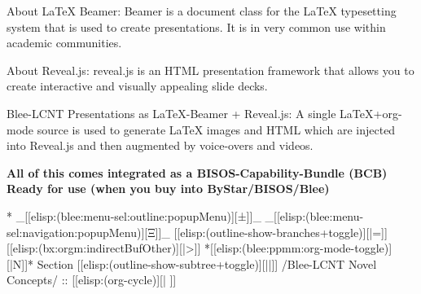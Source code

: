 \begin{whenOrg}
\begin{verblatex}
\begin{frame}[fragile,plain,label=beamerPlusReveal]
    \begin{block}{About LaTeX Beamer:}
      Beamer is a document class for the LaTeX typesetting system that is used to create presentations.
      It is in very common use within academic communities.
    \end{block}

    \begin{block}{About Reveal.js:}
          reveal.js is an HTML presentation framework that allows you to create interactive and visually appealing slide decks.
    \end{block}

    \begin{exampleblock}{Blee-LCNT Presentations as LaTeX-Beamer + Reveal.js:}
          A single LaTeX+org-mode source is used to generate LaTeX images and HTML which are injected into Reveal.js and
          then augmented by voice-overs and videos.
    \end{exampleblock}

    \begin{center}
      \colorbox{blue!30}{\color{black}
       \textbf{All of this comes integrated as a BISOS-Capability-Bundle (BCB)}}
      \colorbox{blue!30}{\color{black}
       \textbf{Ready for use (when you buy into ByStar/BISOS/Blee)}}
    \end{center}


\end{frame}
\end{verblatex}


\begin{whenOrg}
*  _[[elisp:(blee:menu-sel:outline:popupMenu)][±]]_ _[[elisp:(blee:menu-sel:navigation:popupMenu)][Ξ]]_ [[elisp:(outline-show-branches+toggle)][|=]] [[elisp:(bx:orgm:indirectBufOther)][|>]] *[[elisp:(blee:ppmm:org-mode-toggle)][|N]]*  Section    [[elisp:(outline-show-subtree+toggle)][||]]   /Blee-LCNT Novel Concepts/ ::  [[elisp:(org-cycle)][| ]]
\end{whenOrg}


\end{whenOrg}

